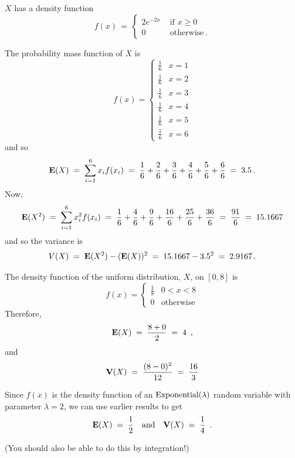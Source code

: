 \begin{ExerciseList}
\item $X$ has a density function
$$
f(x)\,=\, 
\begin{cases} 
2e^{-2x} & \text{ if }  x \geq 0\\ 
0 & \text{ otherwise} \, . 
\end{cases}
$$
\ee
\Answer
\be
\item
The probability mass function of $X$ is
$$f(x)=\begin{cases}\frac{1}{6}&x=1\\
\frac{1}{6}&x=2\\
\frac{1}{6}&x=3\\
\frac{1}{6}&x=4\\
\frac{1}{6}&x=5\\
\frac{1}{6}&x=6
\end{cases}$$
and so
$$\mathbf{E}(X)\;=\;\sum_{i=1}^6
x_if(x_i)\;=\;\frac{1}{6}+\frac{2}{6}+\frac{3}{6}+\frac{4}{6}+\frac{5}{6}+\frac{6}{6}\;=\;3.5\,.$$
Now,
$$\mathbf{E}(X^2)\;=\;\sum_{i=1}^6 x^2_if(x_i)\;=\;\frac{1}{6}+\frac{4}{6}+\frac{9}{6}+\frac{16}{6}+\frac{25}{6}+\frac{36}{6}\;=\;\frac{91}{6}\;=\;15.1667$$
and so  the variance is
\[V(X)\; =\; \mathbf{E}(X^2) - (\mathbf{E}(X))^2 \;=\; 15.1667-3.5^2\;=\;2.9167\,.\] 
  
\item The density function of the uniform distribution, $X$,  on $[0,8]$ is  $$f(x)=\begin{cases}\frac{1}{8}&0<x<8\\0&\textrm{otherwise}\end{cases}$$
Therefore, $$\mathbf{E}(X)\;=\;\frac{8+0}{2}\;=\;4\enspace,$$
and $$\mathbf{V}(X)\;=\;\frac{(8-0)^2}{12}\;=\;\frac{16}{3}$$

\item Since $f(x)$ is the density function of an $\mbox{{\rm Exponential}}(\lambda)$ random variable with parameter $\lambda=2$, we can use earlier results to get
$$\mathbf{E}(X)\;=\;\frac{1}{2}\quad \text{and}\quad
\mathbf{V}(X)\;=\;\frac{1}{4}\enspace.$$

(You should also be able to do this by integration!)
\ee


\end{ExerciseList}
